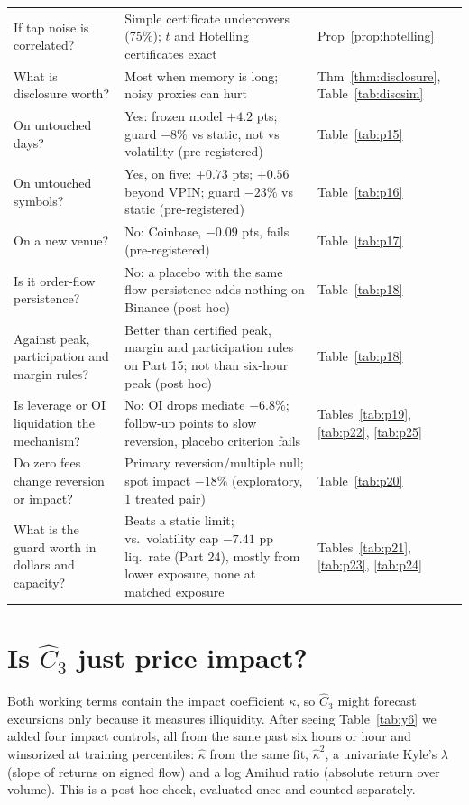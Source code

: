 \documentclass[12pt]{article}
\theoremstyle{definition}
\theoremstyle{remark}
\begin{document}
{\begin{longtable}{p{}p{}p{}}
If tap noise is correlated? & Simple certificate undercovers (75\%); $t$ and Hotelling certificates exact & Prop~\ref{prop:hotelling}\\
What is disclosure worth? & Most when memory is long; noisy proxies can hurt & Thm~\ref{thm:disclosure}, Table~\ref{tab:discsim}\\
On untouched days? & Yes: frozen model $+4.2$ pts; guard $-8\%$ vs static, not vs volatility (pre-registered) & Table~\ref{tab:p15}\\
On untouched symbols? & Yes, on five: $+0.73$ pts; $+0.56$ beyond VPIN; guard $-23\%$ vs static (pre-registered) & Table~\ref{tab:p16}\\
On a new venue? & No: Coinbase, $-0.09$ pts, fails (pre-registered) & Table~\ref{tab:p17}\\
Is it order-flow persistence? & No: a placebo with the same flow persistence adds nothing on Binance (post hoc) & Table~\ref{tab:p18}\\
Against peak, participation and margin rules? & Better than certified peak, margin and participation rules on Part 15; not than six-hour peak (post hoc) & Table~\ref{tab:p18}\\
Is leverage or OI liquidation the mechanism? & No: OI drops mediate $-6.8\%$; follow-up points to slow reversion, placebo criterion fails & Tables~\ref{tab:p19}, \ref{tab:p22}, \ref{tab:p25}\\
Do zero fees change reversion or impact? & Primary reversion/multiple null; spot impact $-18\%$ (exploratory, 1 treated pair) & Table~\ref{tab:p20}\\
What is the guard worth in dollars and capacity? & Beats a static limit; vs.\ volatility cap $-7.41$ pp liq.\ rate (Part 24), mostly from lower exposure, none at matched exposure & Tables~\ref{tab:p21}, \ref{tab:p23}, \ref{tab:p24}\\
\bottomrule
\end{longtable}
}
\section{Is $\hat C_3$ just price impact?}
Both working terms contain the impact coefficient $\kappa$, so $\hat C_3$ might forecast excursions only because it measures illiquidity. After seeing Table~\ref{tab:y6} we added four impact controls, all from the same past six hours or hour and winsorized at training percentiles: $\hat\kappa$ from the same fit, $\hat\kappa^2$, a univariate Kyle's $\lambda$ \citep{kyle1985} (slope of returns on signed flow) and a log Amihud ratio \citep{amihud2002} (absolute return over volume). This is a post-hoc check, evaluated once and counted separately.
\end{document}
